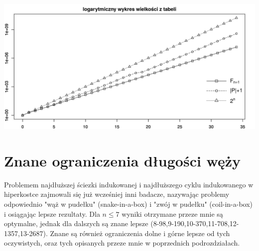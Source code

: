 \documentclass{pracamgr}
\begin{document}
     \begin{center}
      \includegraphics[scale=0.55]{img/plot1.jpg}
     \end{center}
   \section{Znane ograniczenia długości węży}
    Problemem najdłuższej ściezki indukowanej i najdłuższego cyklu indukowanego w hiperkostce zajmowali się już wcześniej inni badacze, nazywając
    problemy odpowiednio "wąż w pudełku" (snake-in-a-box) i "zwój w pudełku" (coil-in-a-box) i osiągając lepsze rezultaty.\newline
    Dla $n\le7$ wyniki otrzymane przeze mnie są optymalne, jednak dla dalszych są znane lepsze\newline
    (8-98,9-190,10-370,11-708,12-1357,13-2687).
    Znane są również ograniczenia dolne i górne lepsze od tych oczywistych, oraz tych opisanych przeze mnie w poprzednich podrozdziałach.
\end{document}
